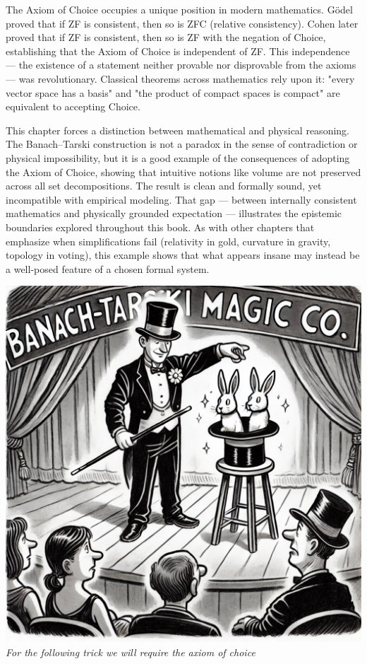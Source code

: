 The Axiom of Choice occupies a unique position in modern mathematics. Gödel proved that if ZF is consistent, then so is ZFC (relative consistency). Cohen later proved that if ZF is consistent, then so is ZF with the negation of Choice, establishing that the Axiom of Choice is independent of ZF. This independence — the existence of a statement neither provable nor disprovable from the axioms — was revolutionary. Classical theorems across mathematics rely upon it: "every vector space has a basis" and "the product of compact spaces is compact" are equivalent to accepting Choice. 

\begin{commentary}[Commentary]
This chapter forces a distinction between mathematical and physical reasoning. The Banach–Tarski construction is not a paradox in the sense of contradiction or physical impossibility, but it is a good example of the consequences of adopting the Axiom of Choice, showing that intuitive notions like volume are not preserved across all set decompositions. The result is clean and formally sound, yet incompatible with empirical modeling. That gap — between internally consistent mathematics and physically grounded expectation — illustrates the epistemic boundaries explored throughout this book. As with other chapters that emphasize when simplifications fail (relativity in gold, curvature in gravity, topology in voting), this example shows that what appears insane may instead be a well-posed feature of a chosen formal system.

\end{commentary}
\vspace{2em}
\begin{center}
    \includegraphics[height=10\baselineskip]{01_BanachTarskiParadox/BANACH.png}\\
    {\small\textit{For the following trick we will require the axiom of choice}}
\end{center}